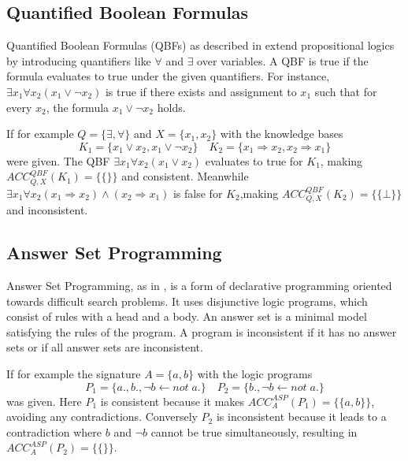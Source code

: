 \subsection{Quantified Boolean Formulas}
Quantified Boolean Formulas (QBFs) as described in \cite{gelfond_logic_2002} extend propositional logics by introducing quantifiers like \(\forall\) and \(\exists\) over variables.
A QBF is true if the formula evaluates to true under the given quantifiers.
For instance, \(\exists x_1 \forall x_2 (x_1 \lor \neg x_2)\) is true if there exists and assignment to \(x_1\) such that for every \(x_2\), the formula \(x_1 \lor \neg x_2\) holds.

If for example \(Q = \{\exists,\forall\}\) and \(X = \{x_1,x_2\}\) with the knowledge bases
\[K_1 = \{x_1 \lor  x_2, x_1 \lor \neg x_2\} \quad K_2 = \{x_1 \Rightarrow x_2, x_2 \Rightarrow x_1\}\]
were given.
The QBF \(\exists x_1 \forall x_2 (x_1 \lor x_2)\) evaluates to true for \(K_1\), making \(ACC^{QBF}_{Q,X}(K_1) = \{\{\}\}\) and consistent.
Meanwhile \(\exists x_1 \forall x_2 (x_1 \Rightarrow x_2) \land (x_2 \Rightarrow x_1)\) is false for \(K_2\),making \(ACC^{QBF}_{Q,X}(K_2) = \{\{\bot\}\}\) and inconsistent.

\subsection{Answer Set Programming}
Answer Set Programming, as in \cite{brewka_answer_2011}, is a form of declarative programming oriented towards difficult search problems.
It uses disjunctive logic programs, which consist of rules with a head and a body.
An answer set is a minimal model satisfying the rules of the program.
A program is inconsistent if it has no answer sets or if all answer sets are inconsistent.

If for example the signature \(A = \{a,b\}\) with the logic programs
\[P_1 = \{a., b., \neg b \leftarrow not \; a.\} \quad P_2 = \{b., \neg b \leftarrow not \; a.\}\]
was given.
Here \(P_1\) is consistent because it makes \(ACC^{ASP}_{A}(P_1) = \{\{a,b\}\}\), avoiding any contradictions.
Conversely \(P_2\) is inconsistent because it leads to a contradiction where \(b\) and \(\neg b\) cannot be true simultaneously, resulting in \(ACC^{ASP}_{A}(P_2) = \{\{\}\}\).

